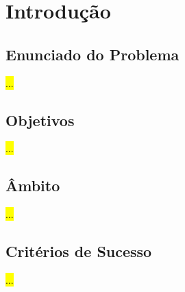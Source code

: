 % 
\chapter{Introdução}
\label{chap:Chapter1}


\section{Enunciado do Problema} 
\label{sec:chap1_problem}

\hl{...}


\section{Objetivos}
\label{sec:chap1_objectives}

\hl{...}


\section{Âmbito}
\label{sec:chap1_scope}

\hl{...}


\section{Critérios de Sucesso}
\label{sec:chap1_success_criteria}

\hl{...}


